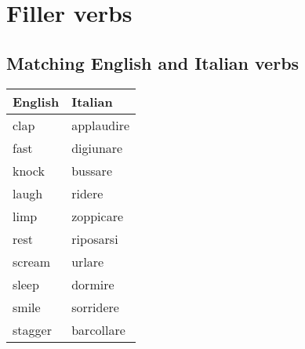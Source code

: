 \section{Filler verbs}

\subsection{Matching English and Italian verbs}

\begin{longtable}{l|l}
\textbf{English}      & \textbf{Italian}    \\
\hline
\endhead
clap	&	applaudire	\\
fast	&	digiunare	\\
knock	&	bussare	\\
laugh	&	ridere	\\
limp	&	zoppicare	\\
rest	&	riposarsi\\
scream	&	urlare	\\
sleep	&	dormire	\\
smile	&	sorridere	\\
stagger	&	barcollare    
\end{longtable}